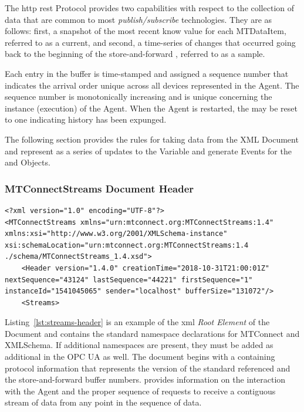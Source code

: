 The \gls{http} \gls{rest} Protocol provides two capabilities with respect to the collection of data that are common to most \textit{publish/subscribe} technologies. They are as follows: first, a snapshot of the most recent know value for each \gls{MTDataItem}, referred to as a \gls{current}, and second, a time-series of changes that occurred going back to the beginning of the store-and-forward , referred to as a \gls{sample}.

Each entry in the \gls{buffer} is time-stamped and assigned a sequence number that indicates the arrival order unique across all devices represented in the \gls{Agent}. The sequence number is monotonically increasing and is unique concerning the instance (execution) of the \gls{Agent}. When the \gls{Agent} is restarted, the  may be reset to one indicating history has been expunged. 

The following section provides the rules for taking data from the  XML Document and represent as a series of updates to the \gls{Variable} and generate \glspl{Event} for the  and  \glspl{Object}.

\subsubsection{MTConnectStreams Document Header}

\begin{lstlisting}[firstnumber=1,escapechar=|,%
    caption={Streams Header},label={lst:streams-header}]
<?xml version="1.0" encoding="UTF-8"?>
<MTConnectStreams xmlns="urn:mtconnect.org:MTConnectStreams:1.4" xmlns:xsi="http://www.w3.org/2001/XMLSchema-instance" xsi:schemaLocation="urn:mtconnect.org:MTConnectStreams:1.4 ./schema/MTConnectStreams_1.4.xsd">
	<Header version="1.4.0" creationTime="2018-10-31T21:00:01Z" nextSequence="43124" lastSequence="44221" firstSequence="1" instanceId="1541045065" sender="localhost" bufferSize="131072"/>
	<Streams>
\end{lstlisting}

Listing~\ref{lst:streams-header} is an example of the \gls{xml} \textit{Root Element} of the  Document and contains the standard namespace declarations for MTConnect and XMLSchema. If additional namespaces are present, they must be added as additional  in the OPC UA  as well. The  document begins with a  containing protocol information that represents the version of the standard referenced and the store-and-forward \gls{buffer}  numbers. \cite{MTCPart1} provides information on the interaction with the \gls{Agent} and the proper sequence of requests to receive a contiguous stream of data from any point in the sequence of data.

